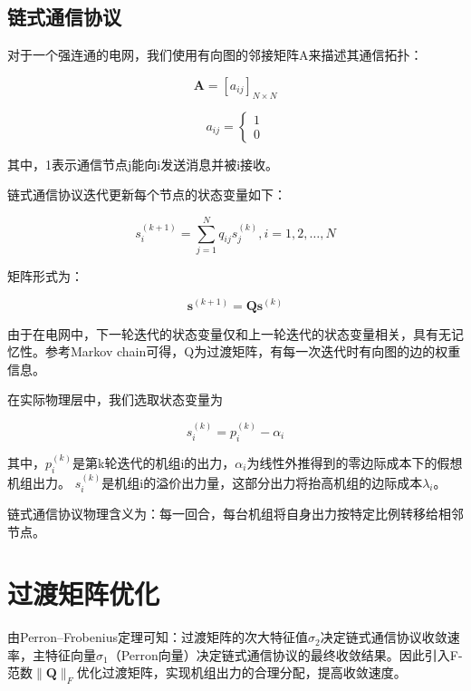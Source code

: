 \subsection{链式通信协议}
对于一个强连通的电网，我们使用有向图的邻接矩阵A来描述其通信拓扑：

\begin{equation}
    \mathbf{A}=\left[a_{i j}\right]_{N \times N}
\end{equation}

\begin{equation}
    a_{i j}=\left\{\begin{array}{l}
    {1} \\
    {0}
    \end{array}\right.
\end{equation}

其中，1表示通信节点j能向i发送消息并被i接收。

链式通信协议迭代更新每个节点的状态变量如下：

\begin{equation}
    s_{i}^{(k+1)}=\sum_{j=1}^{N} q_{i j} s_{j}^{(k)}, i=1,2, \ldots, N
\end{equation}

矩阵形式为：

\begin{equation}
    \mathbf{s}^{(k+1)}=\mathbf{Q} \mathbf{s}^{(k)}
\end{equation}

由于在电网中，下一轮迭代的状态变量仅和上一轮迭代的状态变量相关，具有无记忆性。参考Markov chain可得，Q为过渡矩阵，有每一次迭代时有向图的边的权重信息。

在实际物理层中，我们选取状态变量为

\begin{equation}
    s_{i}^{(k)}=p_{i}^{(k)}-\alpha_{i}
\end{equation}

其中，$p_{i}^{(k)}$是第k轮迭代的机组i的出力，$\alpha_{i}$为线性外推得到的零边际成本下的假想机组出力。 $s_{i}^{(k)}$是机组i的溢价出力量，这部分出力将抬高机组的边际成本$\lambda_{i}$。

链式通信协议物理含义为：每一回合，每台机组将自身出力按特定比例转移给相邻节点。

\section{过渡矩阵优化}

由Perron–Frobenius定理可知：过渡矩阵的次大特征值$\sigma_{2}$决定链式通信协议收敛速率，主特征向量$\sigma_{1}$（Perron向量）决定链式通信协议的最终收敛结果。因此引入F-范数$\|\mathbf{Q}\|_{F}$优化过渡矩阵，实现机组出力的合理分配，提高收敛速度。

